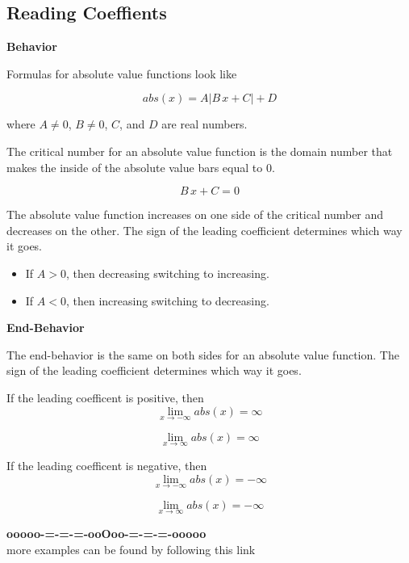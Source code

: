\documentclass{ximera}
\begin{document}
\subsection*{Reading Coeffients}



\textbf{Behavior}


Formulas for absolute value functions look like

\[     abs(x) =    A  | B \, x + C | + D           \]

where $A \ne 0$, $B \ne 0$, $C$, and $D$ are real numbers.





The critical number for an absolute value function is the domain number that makes the inside of the absolute value bars equal to $0$.


\[
B \, x + C = 0
\]


The absolute value function increases on one side of the critical number and decreases on the other.  The sign of the leading coefficient determines which way it goes. 




\begin{itemize}
  \item If $A > 0$, then decreasing switching to increasing.
  \item If $A < 0$, then increasing switching to decreasing.
\end{itemize}










\textbf{End-Behavior}


The end-behavior is the same on both sides for an absolute value function. The sign of the leading coefficient determines which way it goes.


If the leading coefficent is positive, then 
\[
\lim_{x \to -\infty} abs(x) = \infty 
\]
 
\[
\lim_{x \to \infty} abs(x) = \infty 
\]







If the leading coefficent is negative, then 
\[
\lim_{x \to -\infty} abs(x) = -\infty 
\]
 
\[
\lim_{x \to \infty} abs(x) = -\infty 
\]












\begin{center}
\textbf{\textcolor{green!50!black}{ooooo-=-=-=-ooOoo-=-=-=-ooooo}} \\

more examples can be found by following this link\\ 

\end{center}
\end{document}
